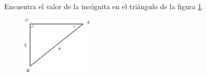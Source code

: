 Encuentra el valor de la incógnita en el triángulo de la figura \ref{fig:angle_functrig_04}.
\begin{figure}[H]
    \begin{center}
        \includegraphics[width=0.3\textwidth]{../images/angle_functrig_04.png}
    \end{center}
    \caption{}
    \label{fig:angle_functrig_04}
\end{figure}
